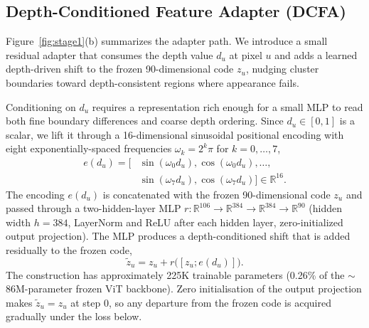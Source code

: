 \documentclass{article}
\begin{document}
\subsection{Depth-Conditioned Feature Adapter (DCFA)}
\label{sec:method:dcfa}

Figure~\ref{fig:stage1}(b) summarizes the adapter path. We introduce a small residual adapter that consumes the depth value $d_u$ at pixel $u$ and adds a learned depth-driven shift to the frozen 90-dimensional code $z_u$, nudging cluster boundaries toward depth-consistent regions where appearance fails.

Conditioning on $d_u$ requires a representation rich enough for a small MLP to read both fine boundary differences and coarse depth ordering. Since $d_u \in [0, 1]$ is a scalar, we lift it through a 16-dimensional sinusoidal positional encoding with eight exponentially-spaced frequencies $\omega_k = 2^k \pi$ for $k = 0, \dots, 7$,
\begin{equation}
\begin{aligned}
e(d_u) = \big[ &\sin(\omega_0 d_u), \cos(\omega_0 d_u), \dots, \\
              &\sin(\omega_7 d_u), \cos(\omega_7 d_u) \big] \in \mathbb{R}^{16}.
\end{aligned}
\label{eq:sinusoid}
\end{equation}
The encoding $e(d_u)$ is concatenated with the frozen 90-dimensional code $z_u$ and passed through a two-hidden-layer MLP $r: \mathbb{R}^{106} \to \mathbb{R}^{384} \to \mathbb{R}^{384} \to \mathbb{R}^{90}$ (hidden width $h = 384$, LayerNorm and ReLU after each hidden layer, zero-initialized output projection). The MLP produces a depth-conditioned shift that is added residually to the frozen code,
\begin{equation}
\tilde z_u = z_u + r\big([z_u; e(d_u)]\big).
\label{eq:residual}
\end{equation}
The construction has approximately 225K trainable parameters (0.26\% of the $\sim$86M-parameter frozen ViT backbone). Zero initialisation of the output projection makes $\tilde z_u = z_u$ at step 0, so any departure from the frozen code is acquired gradually under the loss below.
\end{document}
